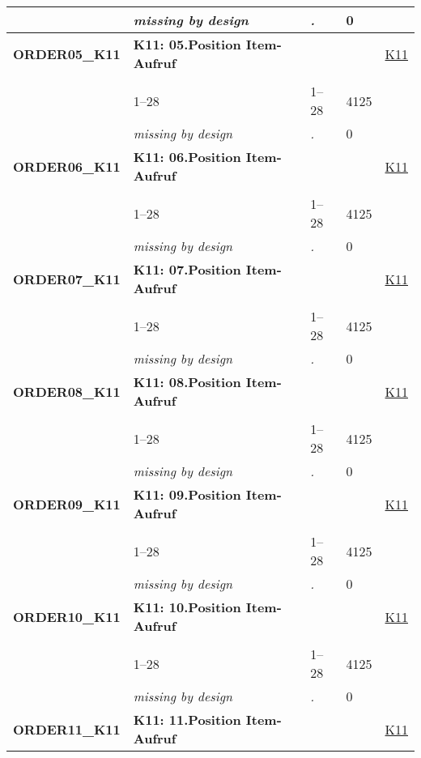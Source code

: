 \begin{longtable}{| L{2.65cm} | L{8cm} | C{1.5cm} | R{1.25cm} | C{2.25cm}  |}
   & \textit{missing by design} & \textit{.} & 0 &  \\ 
   \midrule
\textbf{ORDER05\_K11}\label{var:ORDER05:K11} & \textbf{K11: 05.Position Item-Aufruf} &  &  & \hyperref[K11]{K11} \\ 
   &  &  &  &  \\ 
   & 1--28 & 1--28 & 4125 &  \\ 
   & \textit{missing by design} & \textit{.} & 0 &  \\ 
   \midrule
\textbf{ORDER06\_K11}\label{var:ORDER06:K11} & \textbf{K11: 06.Position Item-Aufruf} &  &  & \hyperref[K11]{K11} \\ 
   &  &  &  &  \\ 
   & 1--28 & 1--28 & 4125 &  \\ 
   & \textit{missing by design} & \textit{.} & 0 &  \\ 
   \midrule
\textbf{ORDER07\_K11}\label{var:ORDER07:K11} & \textbf{K11: 07.Position Item-Aufruf} &  &  & \hyperref[K11]{K11} \\ 
   &  &  &  &  \\ 
   & 1--28 & 1--28 & 4125 &  \\ 
   & \textit{missing by design} & \textit{.} & 0 &  \\ 
   \midrule
\textbf{ORDER08\_K11}\label{var:ORDER08:K11} & \textbf{K11: 08.Position Item-Aufruf} &  &  & \hyperref[K11]{K11} \\ 
   &  &  &  &  \\ 
   & 1--28 & 1--28 & 4125 &  \\ 
   & \textit{missing by design} & \textit{.} & 0 &  \\ 
   \midrule
\textbf{ORDER09\_K11}\label{var:ORDER09:K11} & \textbf{K11: 09.Position Item-Aufruf} &  &  & \hyperref[K11]{K11} \\ 
   &  &  &  &  \\ 
   & 1--28 & 1--28 & 4125 &  \\ 
   & \textit{missing by design} & \textit{.} & 0 &  \\ 
   \midrule
\textbf{ORDER10\_K11}\label{var:ORDER10:K11} & \textbf{K11: 10.Position Item-Aufruf} &  &  & \hyperref[K11]{K11} \\ 
   &  &  &  &  \\ 
   & 1--28 & 1--28 & 4125 &  \\ 
   & \textit{missing by design} & \textit{.} & 0 &  \\ 
   \midrule
\textbf{ORDER11\_K11}\label{var:ORDER11:K11} & \textbf{K11: 11.Position Item-Aufruf} &  &  & \hyperref[K11]{K11} \\ 

\end{longtable}
